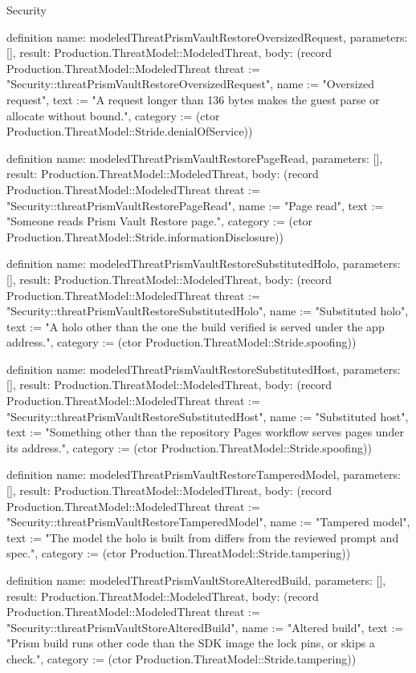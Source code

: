 \begin{lexlean}{Security}
\begin{semanticmodule}
definition{
  name: modeledThreatPrismVaultRestoreOversizedRequest,
  parameters: [],
  result: Production.ThreatModel::ModeledThreat,
  body: (record Production.ThreatModel::ModeledThreat {threat := "Security::threatPrismVaultRestoreOversizedRequest", name := "Oversized request", text := "A request longer than 136 bytes makes the guest parse or allocate without bound.", category := (ctor Production.ThreatModel::Stride.denialOfService)})
}

definition{
  name: modeledThreatPrismVaultRestorePageRead,
  parameters: [],
  result: Production.ThreatModel::ModeledThreat,
  body: (record Production.ThreatModel::ModeledThreat {threat := "Security::threatPrismVaultRestorePageRead", name := "Page read", text := "Someone reads Prism Vault Restore page.", category := (ctor Production.ThreatModel::Stride.informationDisclosure)})
}

definition{
  name: modeledThreatPrismVaultRestoreSubstitutedHolo,
  parameters: [],
  result: Production.ThreatModel::ModeledThreat,
  body: (record Production.ThreatModel::ModeledThreat {threat := "Security::threatPrismVaultRestoreSubstitutedHolo", name := "Substituted holo", text := "A holo other than the one the build verified is served under the app address.", category := (ctor Production.ThreatModel::Stride.spoofing)})
}

definition{
  name: modeledThreatPrismVaultRestoreSubstitutedHost,
  parameters: [],
  result: Production.ThreatModel::ModeledThreat,
  body: (record Production.ThreatModel::ModeledThreat {threat := "Security::threatPrismVaultRestoreSubstitutedHost", name := "Substituted host", text := "Something other than the repository Pages workflow serves pages under its address.", category := (ctor Production.ThreatModel::Stride.spoofing)})
}

definition{
  name: modeledThreatPrismVaultRestoreTamperedModel,
  parameters: [],
  result: Production.ThreatModel::ModeledThreat,
  body: (record Production.ThreatModel::ModeledThreat {threat := "Security::threatPrismVaultRestoreTamperedModel", name := "Tampered model", text := "The model the holo is built from differs from the reviewed prompt and spec.", category := (ctor Production.ThreatModel::Stride.tampering)})
}

definition{
  name: modeledThreatPrismVaultStoreAlteredBuild,
  parameters: [],
  result: Production.ThreatModel::ModeledThreat,
  body: (record Production.ThreatModel::ModeledThreat {threat := "Security::threatPrismVaultStoreAlteredBuild", name := "Altered build", text := "Prism build runs other code than the SDK image the lock pins, or skips a check.", category := (ctor Production.ThreatModel::Stride.tampering)})
}


\end{semanticmodule}
\end{lexlean}
